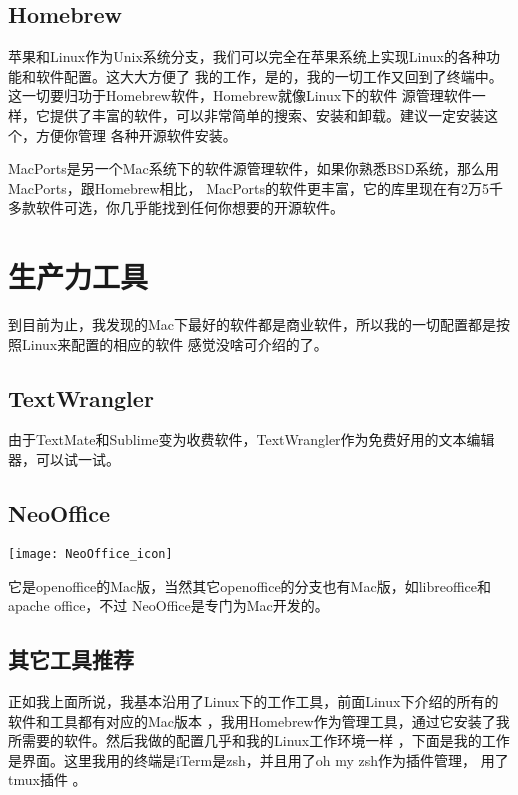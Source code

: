 \documentclass[11pt,fleqn]{book} %
\begin{document}
\subsection{Homebrew}
苹果和Linux作为Unix系统分支，我们可以完全在苹果系统上实现Linux的各种功能和软件配置。这大大方便了
我的工作，是的，我的一切工作又回到了终端中。这一切要归功于Homebrew软件，Homebrew就像Linux下的软件
源管理软件一样，它提供了丰富的软件，可以非常简单的搜索、安装和卸载。建议一定安装这个，方便你管理
各种开源软件安装。
\begin{tips}
  MacPorts是另一个Mac系统下的软件源管理软件，如果你熟悉BSD系统，那么用MacPorts，跟Homebrew相比，
  MacPorts的软件更丰富，它的库里现在有2万5千多款软件可选，你几乎能找到任何你想要的开源软件。
\end{tips}

\section{生产力工具}
到目前为止，我发现的Mac下最好的软件都是商业软件，所以我的一切配置都是按照Linux来配置的相应的软件
感觉没啥可介绍的了。
\subsection{TextWrangler}
由于TextMate和Sublime变为收费软件，TextWrangler作为免费好用的文本编辑器，可以试一试。
\subsection{NeoOffice}
\begin{center}
  \texttt{[image: NeoOffice\_icon]}
\end{center}
它是openoffice的Mac版，当然其它openoffice的分支也有Mac版，如libreoffice和apache office，不过
NeoOffice是专门为Mac开发的。
\subsection{其它工具推荐}
正如我上面所说，我基本沿用了Linux下的工作工具，前面Linux下介绍的所有的软件和工具都有对应的Mac版本
，我用Homebrew作为管理工具，通过它安装了我所需要的软件。然后我做的配置几乎和我的Linux工作环境一样
，下面是我的工作是界面。这里我用的终端是iTerm是zsh，并且用了oh my zsh作为插件管理， 用了 tmux插件
。
\end{document}
